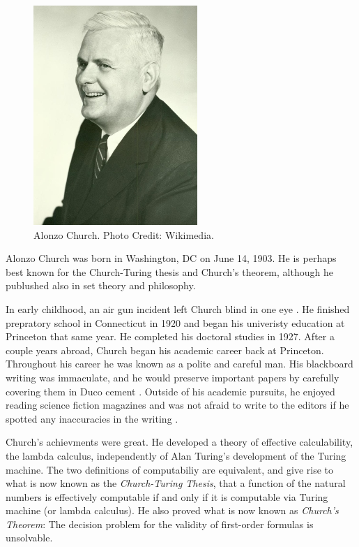 \documentclass[../../../include/open-logic-section]{subfiles}
\begin{document}
\begin{figure}[h!]
\centering 
\includegraphics[scale=1]{alonzo-church.jpg} 
\caption{Alonzo
Church. Photo Credit: Wikimedia.} 
\end{figure}

Alonzo Church was born in Washington, DC on June 14, 1903. He is perhaps
best known for the Church-Turing thesis and Church's theorem, although he
publushed also in set theory and philosophy.
 
In early childhood, an air gun incident left Church blind in one eye
\citep[2]{Enderton2016}. He finished prepratory school in Connecticut in
1920 and began his univeristy education at Princeton that same year. He
completed his doctoral studies in 1927. After a couple years abroad, Church
began his academic career back at Princeton. Throughout his career he was
known as a polite and careful man. His blackboard writing was immaculate,
and he would preserve important papers by carefully covering them in Duco
cement \citep[4]{Enderton2016}. Outside of his academic pursuits, he
enjoyed reading science fiction magazines and was not afraid to write to
the editors if he spotted any inaccuracies in the writing
\citep[5]{Enderton2016}.

Church's achievments were great. He developed a theory of effective
calculability, the lambda calculus, independently of Alan Turing's
development of the Turing machine. The two definitions of computabiliy are
equivalent, and give rise to what is now known as the \emph{Church-Turing
Thesis}, that a function of the natural numbers is effectively computable
if and only if it is computable via Turing machine (or lambda calculus). He
also proved what is now known as \emph{Church's Theorem}: The decision
problem for the validity of first-order formulas is unsolvable.
\end{document}
